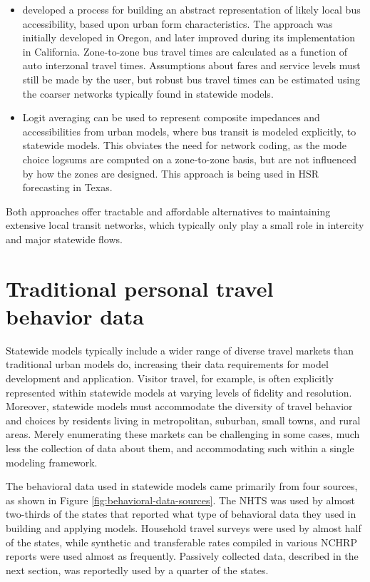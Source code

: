\begin{itemize}
\item
\cite{circella13} developed a process for building an abstract representation of likely local bus accessibility, based upon urban form characteristics. The approach was initially developed in Oregon, and later improved during its implementation in California. Zone-to-zone bus travel times are calculated as a function of auto interzonal travel times. Assumptions about fares and service levels must still be made by the user, but robust bus travel times can be estimated using the coarser networks typically found in statewide models.
\item
Logit averaging can be used to represent composite impedances and accessibilities from urban models, where bus transit is modeled explicitly, to statewide models. This obviates the need for network coding, as the mode choice logsums are computed on a zone-to-zone basis, but are not influenced by how the zones are designed. This approach is being used in HSR forecasting in Texas.
\end{itemize}

Both approaches offer tractable and affordable alternatives to maintaining extensive local transit networks, which typically only play a small role in intercity and major statewide flows.

\section{Traditional personal travel behavior data}\label{sec:traditional-person}

Statewide models typically include a wider range of diverse travel markets than traditional urban models do, increasing their data requirements for model development and application. Visitor travel, for example, is often explicitly represented within statewide models at varying levels of fidelity and resolution. Moreover, statewide models must accommodate the diversity of travel behavior and choices by residents living in metropolitan, suburban, small towns, and rural areas. Merely enumerating these markets can be challenging in some cases, much less the collection of data about them, and accommodating such within a single modeling framework.

The behavioral data used in statewide models came primarily from four sources, as shown in Figure \ref{fig:behavioral-data-sources}. The NHTS was used by almost two-thirds of the states that reported what type of behavioral data they used in building and applying models. Household travel surveys were used by almost half of the states, while synthetic and transferable rates compiled in various NCHRP reports were used almost as frequently. Passively collected data, described in the next section, was reportedly used by a quarter of the states.

